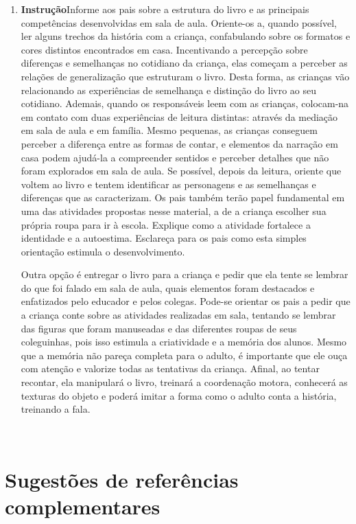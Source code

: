 \documentclass[11pt]{extarticle}
\begin{document}
\begin{enumerate}
\item \textbf{Instrução}\quad Informe aos pais sobre a estrutura do livro e as principais competências desenvolvidas em sala de aula.
Oriente-os a, quando possível, ler alguns trechos da história com a criança, confabulando sobre os formatos e cores distintos encontrados em casa.
Incentivando a percepção sobre diferenças e semelhanças no cotidiano da criança, elas começam a perceber as relações de generalização que estruturam o livro.
Desta forma, as crianças vão relacionando as experiências de semelhança e distinção do livro ao seu cotidiano.
Ademais, quando os responsáveis leem com as crianças, colocam-na em contato com duas experiências de leitura distintas: através da mediação em sala de aula e em família. 
Mesmo pequenas, as crianças conseguem perceber a diferença entre 
as formas de contar, e elementos da narração em casa podem ajudá-la a compreender 
sentidos e perceber detalhes que não foram explorados em sala de aula. Se possível, depois da leitura, oriente 
que voltem ao livro e tentem identificar as personagens e as semelhanças e diferenças que as caracterizam.
Os pais também terão papel fundamental em uma das atividades propostas nesse material, a de a criança escolher sua própria roupa para ir à escola. Explique como a atividade fortalece a identidade e a autoestima. Esclareça para os pais como esta simples orientação estimula o desenvolvimento. 

Outra opção é entregar o livro para a criança e pedir que ela tente se lembrar
do que foi falado em sala de aula, quais elementos foram destacados e enfatizados pelo educador e pelos colegas. Pode-se orientar os pais a pedir que a criança conte sobre as atividades realizadas em sala, tentando se lembrar das figuras que foram manuseadas e das diferentes roupas de seus coleguinhas, pois isso estimula a criatividade e a memória dos alunos. Mesmo que a memória não pareça 
completa para o adulto, é importante que ele ouça com atenção e 
valorize todas as tentativas da criança. Afinal, ao tentar recontar, 
ela manipulará o livro, treinará a coordenação motora, conhecerá as texturas 
do objeto e poderá imitar a forma como o adulto 
conta a história, treinando a fala. 
\end{enumerate}

 
\section{Sugestões de referências complementares}
\end{document}
